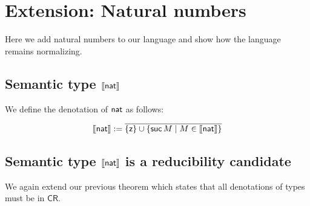 \documentclass{article}
\newcommand{\CR}{\textsf{CR}}
\newcommand{\clos}[1]{\overline{#1}}
\def\lv{\mathopen{{[\kern-0.14em[}}}    %
\def\rv{\mathclose{{]\kern-0.14em]}}}   %
\newcommand{\den}[1]{\lv #1 \rv}
\begin{document}
 \section{Extension: Natural numbers}
Here we add natural numbers to our language and show how the language remains normalizing.
\subsection{Semantic type $\den{\nat}$} We define the denotation of $\mathsf{nat}$ as
 follows:

 \[
 \den{\nat} := \clos{\{\zero\}\cup \{\suc M \mid M \in \den{\nat}\} }
 \]


\subsection{Semantic type $\den{\nat}$ is a reducibility candidate}
We again extend our previous theorem which states that all denotations of types must be in $\CR$.
\end{document}
